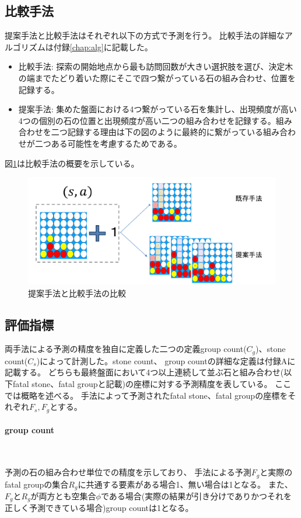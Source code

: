 \subsection{比較手法}
提案手法と比較手法はそれぞれ以下の方式で予測を行う。
比較手法の詳細なアルゴリズムは付録\ref{chap:alg}に記載した。
\begin{itemize}
	\item 比較手法: 探索の開始地点から最も訪問回数が大きい選択肢を選び、決定木の端までたどり着いた際にそこで四つ繋がっている石の組み合わせ、位置を記録する。
	\item 提案手法: 集めた盤面における4つ繋がっている石を集計し、出現頻度が高い4つの個別の石の位置と出現頻度が高い二つの組み合わせを記録する。組み合わせを二つ記録する理由は下の図のように最終的に繋がっている組み合わせが二つある可能性を考慮するためである。
\end{itemize}
図\ref{fig:compare}は比較手法の概要を示している。
\begin{figure}[t]
	\centering
	\includegraphics[width=\linewidth]{./figure/compare.pdf}
	\caption{提案手法と比較手法の比較}
	\label{fig:compare}
\end{figure}

\subsection{評価指標}
両手法による予測の精度を独自に定義した二つの定義group count($C_g$)、stone count($C_s$)によって計測した。stone count、 group countの詳細な定義は付録Aに記載する。
どちらも最終盤面において4つ以上連続して並ぶ石と組み合わせ(以下fatal stone、fatal groupと記載)の座標に対する予測精度を表している。
ここでは概略を述べる。
手法によって予測されたfatal stone、fatal groupの座標をそれぞれ$F_s, F_g$とする。

\paragraph{group count}~
\par 予測の石の組み合わせ単位での精度を示しており、
手法による予測$F_g$と実際のfatal groupの集合$R_g$に共通する要素がある場合1、無い場合は1となる。
また、$F_g$と$R_g$が両方とも空集合$\phi$である場合(実際の結果が引き分けでありかつそれを正しく予測できている場合)group countは1となる。
